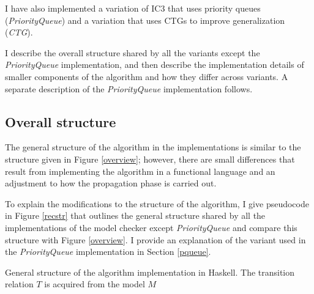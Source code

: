 \documentclass[12pt,a4paper,twoside,openright]{report}
\begin{document}
{I have also implemented a variation of IC3 that uses priority queues (\emph{PriorityQueue}) and a
variation that uses CTGs to improve generalization (\emph{CTG}).

I describe the overall structure shared by all the variants except the
\emph{PriorityQueue} implementation, and then describe the implementation
details of smaller components of the algorithm and how they differ across
variants. A separate description of the \emph{PriorityQueue} implementation
follows.

\subsection{Overall structure}

The general structure of the algorithm in the implementations is similar
to the structure given in Figure \ref{overview}; however, there are
small differences that result from implementing the algorithm in a
functional language and an adjustment to how the propagation phase is
carried out.

To explain the modifications to the structure of the algorithm,
I give pseudocode in Figure \ref{recstr}
that outlines the general structure shared by all the
implementations of the model checker except {\it PriorityQueue}
and compare this structure with Figure \ref{overview}.
I provide an explanation of the variant used in the
{\it PriorityQueue} implementation in Section
\ref{pqueue}.

\begin{algorithm}[t]
\DontPrintSemicolon
{}
\caption{General structure of the algorithm implementation in Haskell. The transition relation $T$ is acquired
from the model $M$}
\label{recstr}
\end{algorithm}

}
\end{document}
